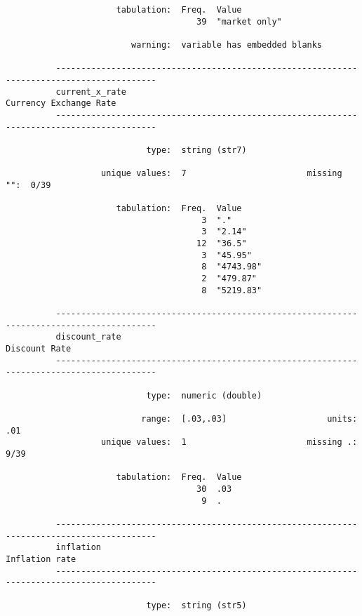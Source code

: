 \documentclass{article}
\begin{document}
\begin{verbatim}
                      tabulation:  Freq.  Value
                                      39  "market only"
          
                         warning:  variable has embedded blanks
          
          ------------------------------------------------------------------------------------------
          current_x_rate                                                      Currency Exchange Rate
          ------------------------------------------------------------------------------------------
          
                            type:  string (str7)
          
                   unique values:  7                        missing "":  0/39
          
                      tabulation:  Freq.  Value
                                       3  "."
                                       3  "2.14"
                                      12  "36.5"
                                       3  "45.95"
                                       8  "4743.98"
                                       2  "479.87"
                                       8  "5219.83"
          
          ------------------------------------------------------------------------------------------
          discount_rate                                                                Discount Rate
          ------------------------------------------------------------------------------------------
          
                            type:  numeric (double)
          
                           range:  [.03,.03]                    units:  .01
                   unique values:  1                        missing .:  9/39
          
                      tabulation:  Freq.  Value
                                      30  .03
                                       9  .
          
          ------------------------------------------------------------------------------------------
          inflation                                                                   Inflation rate
          ------------------------------------------------------------------------------------------
          
                            type:  string (str5)
          

\end{verbatim}
\end{document}
